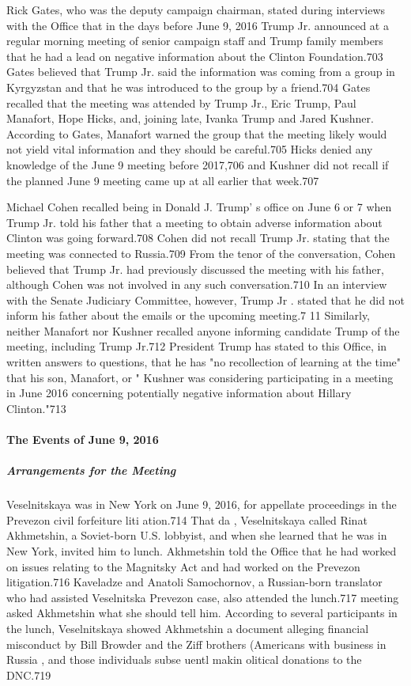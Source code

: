 Rick Gates,  who was the deputy campaign chairman, stated during interviews with the Office that in the days before June 9, 2016 Trump Jr. announced at a regular morning meeting of senior campaign staff and Trump family members that he had a lead on negative information about the Clinton Foundation.703 Gates believed that Trump Jr. said the information was coming from a group in Kyrgyzstan and that he was introduced to the group by a  friend.704 Gates recalled that the meeting was attended by Trump Jr., Eric Trump, Paul Manafort, Hope Hicks, and, joining late, Ivanka Trump and Jared Kushner. According to Gates, Manafort warned the group that the meeting likely would not yield vital information and they should be careful.705 Hicks denied any knowledge of the June 9 meeting before 2017,706 and Kushner did not recall if the planned June 9 meeting came up at all earlier that week.707

Michael Cohen recalled being in Donald J. Trump' s office on June 6 or 7 when Trump Jr. told his father that a  meeting to obtain adverse information about Clinton was going forward.708 Cohen did not recall Trump Jr. stating that the meeting was connected to Russia.709 From the tenor of the conversation, Cohen believed that Trump Jr. had previously discussed the meeting with his father, although Cohen was not involved in any such conversation.710 In an interview with the Senate Judiciary Committee, however, Trump Jr . stated that he did not inform his father about the emails or the upcoming meeting.7 11 Similarly,  neither Manafort nor Kushner recalled anyone informing candidate Trump of the meeting,  including Trump Jr.712 President Trump has stated to this Office, in written answers to questions, that he has "no recollection of learning at the time" that his son, Manafort, or " Kushner was considering participating in a  meeting in June 2016 concerning potentially negative information about Hillary Clinton."713

\paragraph{The Events of June 9, 2016}

\subparagraph{Arrangements for the Meeting}

Veselnitskaya was in New York on June 9, 2016, for appellate proceedings in the Prevezon civil forfeiture liti ation.714 That da , Veselnitskaya called Rinat Akhmetshin,  a  Soviet-born U.S. lobbyist, and when she learned that he was in New York,  invited him to lunch. Akhmetshin told the Office that he had worked on issues relating to the Magnitsky Act and had worked on the Prevezon litigation.716 Kaveladze and Anatoli Samochornov, a Russian-born translator who had assisted Veselnitska Prevezon case, also attended the lunch.717 meeting asked Akhmetshin what she should tell him. According to several participants in the lunch, Veselnitskaya showed Akhmetshin a document alleging financial misconduct by Bill Browder and the Ziff brothers (Americans with business in Russia , and those individuals subse uentl makin olitical donations to the DNC.719

